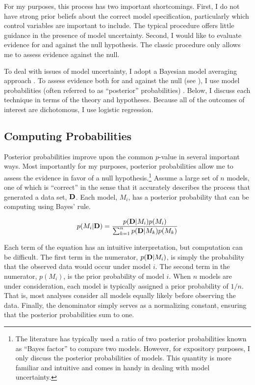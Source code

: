 \documentclass[12pt]{article}
\begin{document}
For my purposes, this process has two important shortcomings. First, I do not have strong prior beliefs about the correct model specification, particularly which control variables are important to include. The typical procedure offers little guidance in the presence of model uncertainty. Second, I would like to evaluate evidence for and against the null hypothesis. The classic procedure only allows me to assess evidence against the null. 

To deal with issues of model uncertainty, I adopt a Bayesian model averaging approach \citep{Raftery1995, MontgomeryNyhan2010}. To assess evidence both for and against the null (see \citealt{Gill1999}), I use model probabilities (often referred to as ``posterior'' probabilities) \citep{Jackman2009, Gill2008, Jackman2004}. Below, I discuss each technique in terms of the theory and hypotheses. Because all of the outcomes of interest are dichotomous, I use logistic regression.

\subsection*{Computing Probabilities}

Posterior probabilities improve upon the common $p$-value in several important ways. Most importantly for my purposes, posterior probabilities allow me to assess the evidence in favor of a null hypothesis.\footnote{The literature has typically used a ratio of two posterior probabilities known as ``Bayes factor'' to compare two models. However, for expository purposes, I only discuss the posterior probabilities of models. This quantity is more familiar and intuitive and comes in handy in dealing with model uncertainty.} Assume a large set of $n$ models, one of which is ``correct'' in the sense that it accurately describes the process that generated a data set, ${\bf D}$. Each model, $M_i$, has a posterior probability that can be computing using Bayes' rule.

\begin{equation}\nonumber
p(M_i | {\bf D}) = \dfrac{p({\bf D} | M_i)p(M_i)}{\sum_{k=1}^{n}p({\bf D} | M_k)p(M_k)}\label{eqn:PostProb}
\end{equation}

Each term of the equation has an intuitive interpretation, but computation can be difficult. The first term in the numerator, $p({\bf D} | M_i)$, is simply the probability that the observed data would occur under model $i$. The second term in the numerator, $p(M_i)$, is the prior probability of model $i$. When $n$ models are under consideration, each model is typically assigned a prior probability of $1/n$. That is, most analyses consider all models equally likely before observing the data. Finally, the denominator simply serves as a normalizing constant, ensuring that the posterior probabilities sum to one. 
\end{document}
